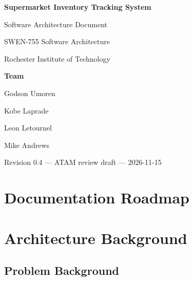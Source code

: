 \documentclass[10pt,letterpaper]{article}
\begin{document}
\begin{titlepage}
  \centering
  \vspace*{3cm}
  {\LARGE\bfseries Supermarket Inventory Tracking System\par}
  \vspace{0.6cm}
  {\Large Software Architecture Document\par}
  \vspace{2.2cm}
  {\large SWEN-755 Software Architecture\par}
  \vspace{0.2cm}
  {\large Rochester Institute of Technology\par}
  \vspace{2.2cm}
  {\large\bfseries Team\par}
  \vspace{0.3cm}
  {\large Godson Umoren\par}
  {\large Kobe Laprade\par}
  {\large Leon Letournel\par}
  {\large Mike Andrews\par}
  \vfill
  {\large Revision 0.4 --- ATAM review draft --- 2026-11-15\par}
\end{titlepage}

\thispagestyle{plain}
\tableofcontents
\clearpage
{}

\section{Documentation Roadmap}\label{sec:roadmap}









\section{Architecture Background}\label{sec:background}
\subsection{Problem Background}\label{sec:problem-bg}



\end{document}
